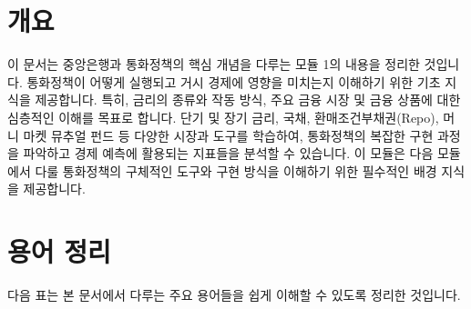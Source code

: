 \documentclass[11pt,a4paper]{article}
\begin{document}
\section*{개요}
이 문서는 중앙은행과 통화정책의 핵심 개념을 다루는 모듈 1의 내용을 정리한 것입니다.
통화정책이 어떻게 실행되고 거시 경제에 영향을 미치는지 이해하기 위한 기초 지식을 제공합니다.
특히, 금리의 종류와 작동 방식, 주요 금융 시장 및 금융 상품에 대한 심층적인 이해를 목표로 합니다.
단기 및 장기 금리, 국채, 환매조건부채권(Repo), 머니 마켓 뮤추얼 펀드 등 다양한 시장과 도구를 학습하여,
통화정책의 복잡한 구현 과정을 파악하고 경제 예측에 활용되는 지표들을 분석할 수 있습니다.
이 모듈은 다음 모듈에서 다룰 통화정책의 구체적인 도구와 구현 방식을 이해하기 위한 필수적인 배경 지식을 제공합니다.

\newpage
\section*{용어 정리}
다음 표는 본 문서에서 다루는 주요 용어들을 쉽게 이해할 수 있도록 정리한 것입니다.
\end{document}
